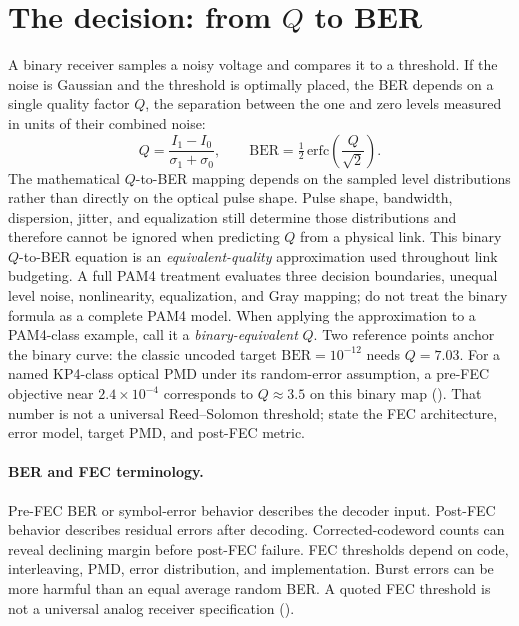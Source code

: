 \section{The decision: from \texorpdfstring{$Q$}{Q} to BER}
\label{sec:qber}

A binary receiver samples a noisy voltage and compares it to a threshold. If the
noise is Gaussian and the threshold is optimally placed, the BER depends on a
single quality factor $Q$, the separation between the one and zero levels
measured in units of their combined noise:
\[
  Q = \frac{I_1 - I_0}{\sigma_1 + \sigma_0},
  \qquad
  \mathrm{BER} = \tfrac{1}{2}\,\mathrm{erfc}\!\left(\frac{Q}{\sqrt{2}}\right).
\]
The mathematical $Q$-to-BER mapping depends on the sampled level distributions
rather than directly on the optical pulse shape. Pulse shape, bandwidth,
dispersion, jitter, and equalization still determine those distributions and
therefore cannot be ignored when predicting $Q$ from a physical link. This
binary $Q$-to-BER equation is an \emph{equivalent-quality} approximation used
throughout link budgeting. A full PAM4 treatment evaluates three decision
boundaries, unequal level noise, nonlinearity, equalization, and Gray mapping; do
not treat the binary formula as a complete PAM4 model. When applying the
approximation to a PAM4-class example, call it a \emph{binary-equivalent} $Q$.
 Two reference points anchor the binary curve: the classic uncoded
target $\mathrm{BER}=10^{-12}$ needs $Q=7.03$. For a named KP4-class optical PMD
under its random-error assumption, a pre-FEC objective near $2.4\times10^{-4}$
corresponds to $Q\approx3.5$ on this binary map (). That number is
not a universal Reed--Solomon threshold; state the FEC architecture, error model,
target PMD, and post-FEC metric.

\paragraph{BER and FEC terminology.}
Pre-FEC BER or symbol-error behavior describes the decoder input. Post-FEC
behavior describes residual errors after decoding. Corrected-codeword counts can
reveal declining margin before post-FEC failure. FEC thresholds depend on code,
interleaving, PMD, error distribution, and implementation. Burst errors can be
more harmful than an equal average random BER. A quoted FEC threshold is not a
universal analog receiver specification ().


